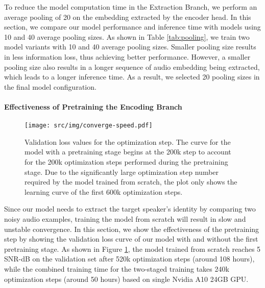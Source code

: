 To reduce the model computation time in the Extraction Branch, we perform an average pooling of 20 on the embedding extracted by the encoder head. In this section, we compare our model performance and inference time with models using 10 and 40 average pooling sizes. As shown in Table \ref{tab:pooling}, we train two model variants with 10 and 40 average pooling sizes. Smaller pooling size results in less information loss, thus achieving better performance. However, a smaller pooling size also results in a longer sequence of audio embedding being extracted, which leads to a longer inference time. As a result, we selected 20 pooling sizes in the final model configuration. 


\paragraph{Effectiveness of Pretraining the Encoding Branch}

\begin{figure}[!t]
\begin{center}
\centerline{\texttt{[image: src/img/converge-speed.pdf]}}
\caption{Validation loss values for the optimization step. The curve for the model with a pretraining stage begins at the 200k step to account for the 200k optimization steps performed during the pretraining stage. Due to the significantly large optimization step number required by the model trained from scratch, the plot only shows the learning curve of the first 600k optimization steps.}
\label{fig:converge-speed}
\end{center}
\vskip -0.3in
\end{figure}

Since our model needs to extract the target speaker's identity by comparing two noisy audio examples, training the model from scratch will result in slow and unstable convergence. In this section, we show the effectiveness of the pretraining step by showing the validation loss curve of our model with and without the first pretraining stage. As shown in Figure \ref{fig:converge-speed}, the model trained from scratch reaches 5 SNR-dB on the validation set after 520k optimization steps (around 108 hours), while the combined training time for the two-staged training takes 240k optimization steps (around 50 hours) based on single Nvidia A10 24GB GPU. 

